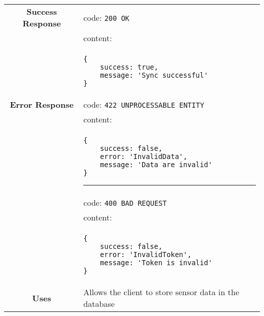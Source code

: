 \begin{adjustwidth}{1cm}{}
\begin{longtable}{|c|l|}
            \hline
            \textbf{Success Response} & code: \texttt{200 OK} \\
            &                           content: \\
            & \begin{minipage}[t]{0.5\textwidth}
                \begin{adjustwidth}{1.5cm}{}
                \begin{verbatim}
{
    success: true, 
    message: 'Sync successful'
}
                \end{verbatim}
                \end{adjustwidth}
              \end{minipage} \\
              \hline
            \textbf{Error Response} & code: \texttt{422 UNPROCESSABLE ENTITY} \\
            &                         content: \\
            & \begin{minipage}[t]{0.7\textwidth}
                \begin{adjustwidth}{1.5cm}{}
                \begin{verbatim}
{
    success: false, 
    error: 'InvalidData',
    message: 'Data are invalid'
}
                \end{verbatim}
                \end{adjustwidth}
                \par\noindent\rule{\textwidth}{1pt}
                 \vspace{4pt}
              \end{minipage} \\
          &                         code: \texttt{400 BAD REQUEST} \\
          &                         content: \\
          & \begin{minipage}[t]{0.7\textwidth}
            \begin{adjustwidth}{1.5cm}{}
                \begin{verbatim}
{
    success: false, 
    error: 'InvalidToken',
    message: 'Token is invalid'
}
                \end{verbatim}
                \end{adjustwidth}
          \end{minipage} \\
              \hline
            \textbf{Uses} & Allows the client to store sensor data in the database \\
            \hline
        \end{longtable}
    \end{adjustwidth}
    
